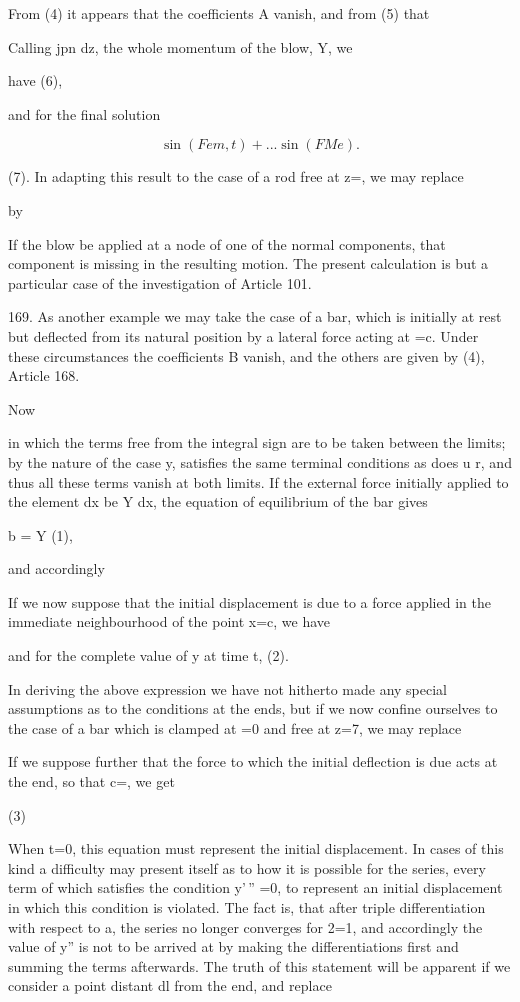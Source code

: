 From (4) it appears that the coefficients A vanish, and from (5) that

Calling jpn dz, the whole momentum of the blow, Y, we

have (6),

and for the final solution

\[\sin(Fem,t) +...  \sin(F Me).\]

(7). In adapting this result to the case of a rod free at z=, we may
replace

by

If the blow be applied at a node of one of the normal components, that
component is missing in the resulting motion. The present calculation is
but a particular case of the investigation of Article 101.

169. As another example we may take the case of a bar, which is
initially at rest but deflected from its natural position by a lateral
force acting at =c. Under these circumstances the coefficients B vanish,
and the others are given by (4), Article 168.

Now

in which the terms free from the integral sign are to be taken between
the limits; by the nature of the case y, satisfies the same terminal
conditions as does u r, and thus all these terms vanish at both limits.
If the external force initially applied to the element dx be Y dx, the
equation of equilibrium of the bar gives

b = Y (1),

and accordingly

If we now suppose that the initial displacement is due to a force
applied in the immediate neighbourhood of the point x=c, we have

and for the complete value of y at time t, (2).

In deriving the above expression we have not hitherto made any special
assumptions as to the conditions at the ends, but if we now confine
ourselves to the case of a bar which is clamped at =0 and free at z=7,
we may replace

If we suppose further that the force to which the initial deflection is
due acts at the end, so that c=, we get

(3)

When t=0, this equation must represent the initial displacement. In
cases of this kind a difficulty may present itself as to how it is
possible for the series, every term of which satisfies the condition
y'\,'' =0, to represent an initial displacement in which this condition
is violated. The fact is, that after triple differentiation with respect
to a, the series no longer converges for 2=1, and accordingly the value
of y'' is not to be arrived at by making the differentiations first and
summing the terms afterwards. The truth of this statement will be
apparent if we consider a point distant dl from the end, and replace


